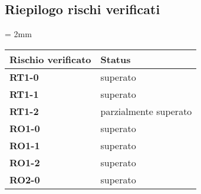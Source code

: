 \subsection{Riepilogo rischi verificati}
    \tabulinesep = 2mm %
    \begin{longtabu} to \textwidth {| X[0.1,c m] | X[0.1,c m] |} %
        \hline

        \textbf{Rischio verificato} & \textbf{Status} \\
        \hline

        \textbf{RT1-0} & superato\\
        \hline 
        \textbf{RT1-1} & superato\\
        \hline
        \textbf{RT1-2} & parzialmente superato\\
        \hline
        \textbf{RO1-0} & superato \\ 
        \hline
        \textbf{RO1-1} & superato \\ 
        \hline
        \textbf{RO1-2} & superato \\ 
        \hline
        \textbf{RO2-0} & superato \\ 
        \hline

    \end{longtabu}
